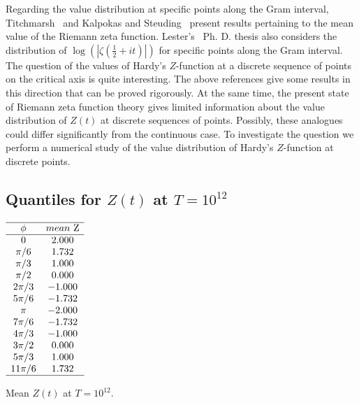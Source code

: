 \documentclass[twoside]{article}
\begin{document}
Regarding the value distribution at specific points along the Gram interval, Titchmarsh~\cite{Titchmarsh 1934} and Kalpokas and Steuding~\cite{kalpokas 2009} present results pertaining to the
mean value of the Riemann zeta function. Lester's~\cite{Lester 2013} Ph. D. thesis also considers the distribution of $\log (|\zeta(\frac{1}{2} + it)|)$  for specific points along the Gram interval.  
The question of the values of Hardy's $Z$-function at a discrete sequence of points on the critical axis is quite interesting. The above references give some results in this direction that can be proved rigorously. At the same time, the present state of Riemann zeta function theory gives limited information about the value distribution of $Z(t)$ at discrete sequences of points. Possibly, these analogues could differ significantly from the continuous case. To investigate the question we perform a numerical study of the value distribution of Hardy's $Z$-function at discrete points. 


\subsection{\label{E12}Quantiles for $Z(t)$ at $T=10^{12}$}


\begin{table}
\centering \(\begin{array}{cc}
\hline
\phi&mean~$Z$ \\

\hline
0&2.000 \\
\pi/6 &1.732 \\
\pi/3 &1.000 \\
\pi/2 &0.000 \\
2\pi/3 &-1.000 \\
5\pi/6 &-1.732 \\
\pi &-2.000 \\
7\pi/6 &-1.732 \\
4\pi/3 &-1.000 \\
3\pi/2 &0.000 \\
5\pi/3 &1.000 \\
11\pi/6 &1.732 \\
\hline
\end{array}\)
\caption{Mean    $Z(t)$ at $T=10^{12}$.}
\label{tab:mean12}
\end{table}
\end{document}

